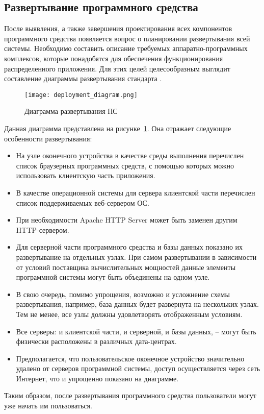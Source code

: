 \subsection{Развертывание программного средства}
\label{sec:design:deployment}

После выявления, а также завершения проектирования всех компонентов программного средства появляется вопрос о планировании развертывания всей системы. Необходимо составить описание требуемых аппаратно-программных комплексов, которые понадобятся для обеспечения функционирования распределенного приложения. Для этих целей целесообразным выглядит составление диаграммы развертывания стандарта \uml. 

\begin{figure}[!ht]
\centering
	\texttt{[image: deployment\_diagram.png]}
	\caption{Диаграмма развертывания ПС}
	\label{fig:design:deployment:diagram}
\end{figure}

Данная диаграмма представлена на рисунке~\ref{fig:design:deployment:diagram}. Она отражает следующие особенности развертывания:

\begin{itemize}
	\item На узле оконечного устройства в качестве среды выполнения перечислен список браузерных программных средств, с помощью которых можно использовать клиентскую часть приложения.
	\item В качестве операционной системы для сервера клиентской части перечислен список поддерживаемых веб-сервером ОС.
	\item При необходимости Apache HTTP Server может быть заменен другим HTTP-сервером.
	\item Для серверной части программного средства и базы данных показано их развертывание на отдельных узлах. При самом развертывании в зависимости от условий поставщика вычислительных мощностей данные элементы программной системы могут быть объединены на одном узле.
	\item В свою очередь, помимо упрощения, возможно и усложнение схемы развертывания, например, база данных будет развернута на нескольких узлах. Тем не менее, все узлы должны удовлетворять отображенным условиям.
	\item Все серверы: и клиентской части, и серверной, и базы данных, -- могут быть физически расположены в различных дата-центрах.
	\item Предполагается, что пользовательское оконечное устройство зна\-чи\-те\-льно удалено от серверов программной системы, доступ осуществляется через сеть Интернет, что и упрощенно показано на диаграмме.
\end{itemize}

Таким образом, после развертывания программного средства пользователи могут уже начать им пользоваться.
